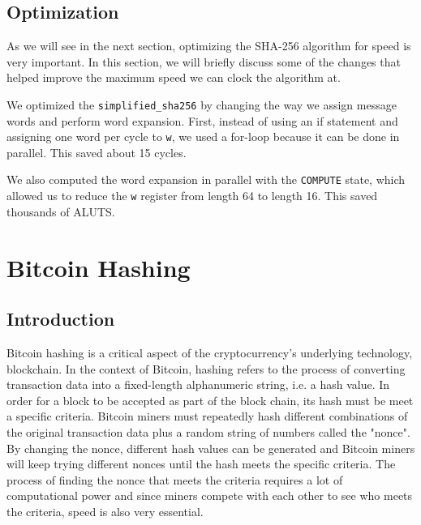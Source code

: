 \documentclass{article}
\begin{document}
\subsection{Optimization}

As we will see in the next section, optimizing the SHA-256 algorithm for speed is very important. In this section, we will briefly discuss some of the changes that helped improve the maximum speed we can clock the algorithm at.

We optimized the \verb|simplified_sha256| by changing the way we assign message words and perform word expansion. First, instead of using an if statement and assigning one word per cycle to \verb|w|, we used a for-loop because it can be done in parallel. This saved about 15 cycles.


We also computed the word expansion in parallel with the \verb|COMPUTE| state, which allowed us to reduce the \verb|w| register from length 64 to length 16. This saved thousands of ALUTS. 






\newpage
\section{Bitcoin Hashing}

\subsection{Introduction}


Bitcoin hashing is a critical aspect of the cryptocurrency's underlying technology, blockchain. In the context of Bitcoin, hashing refers to the process of converting transaction data into a fixed-length alphanumeric string, i.e. a hash value. In order for a block to be accepted as part of the block chain, its hash must be meet a specific criteria. Bitcoin miners must repeatedly hash different combinations of the original transaction data plus a random string of numbers called the "nonce". By changing the nonce, different hash values can be generated and Bitcoin miners will keep trying different nonces until the hash meets the specific criteria. The process of finding the nonce that meets the criteria requires a lot of computational power and since miners compete with each other to see who meets the criteria, speed is also very essential.
\end{document}
